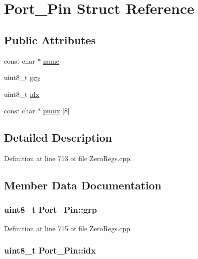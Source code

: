 \hypertarget{struct_port___pin}{}\section{Port\+\_\+\+Pin Struct Reference}
\label{struct_port___pin}
\subsection*{Public Attributes}
\begin{DoxyCompactItemize}
\item 
const char $\ast$ \hyperlink{struct_port___pin_abdb274a593040cfbdbb903fac65e8a1f}{name}
\item 
uint8\+\_\+t \hyperlink{struct_port___pin_a4815156f6ae00fafe5a9dd5f725f06e8}{grp}
\item 
uint8\+\_\+t \hyperlink{struct_port___pin_aa0152a075f602f9ea1be98921844f981}{idx}
\item 
const char $\ast$ \hyperlink{struct_port___pin_a7818a63c184b495208403621b5fe7f11}{pmux} \mbox{[}8\mbox{]}
\end{DoxyCompactItemize}


\subsection{Detailed Description}


Definition at line 713 of file Zero\+Regs.\+cpp.



\subsection{Member Data Documentation}
\subsubsection[{\texorpdfstring{grp}{grp}}]{\setlength{\rightskip}{0pt plus 5cm}uint8\+\_\+t Port\+\_\+\+Pin\+::grp}\hypertarget{struct_port___pin_a4815156f6ae00fafe5a9dd5f725f06e8}{}\label{struct_port___pin_a4815156f6ae00fafe5a9dd5f725f06e8}


Definition at line 715 of file Zero\+Regs.\+cpp.

\subsubsection[{\texorpdfstring{idx}{idx}}]{\setlength{\rightskip}{0pt plus 5cm}uint8\+\_\+t Port\+\_\+\+Pin\+::idx}\hypertarget{struct_port___pin_aa0152a075f602f9ea1be98921844f981}{}\label{struct_port___pin_aa0152a075f602f9ea1be98921844f981}


